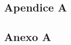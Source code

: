 \begin{apendicesenv}
\partapendices		%

\chapter{Apendice A}

\end{apendicesenv}

\begin{anexosenv}
\partanexos		%

\chapter{Anexo A}

\end{anexosenv}
